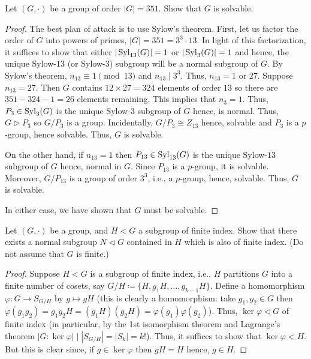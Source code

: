 \begin{problem}
Let $(G,\cdot)$ be a group of order $|G|=351$. Show that $G$ is solvable.
\end{problem}
\begin{proof}
The best plan of attack is to use Sylow's theorem. First, let us factor the
order of $G$ into powers of primes, $|G|=351=3^3\cdot 13$. In light of this
factorization, it suffices to show that either $|\operatorname{Syl}_{13}(G)|=1$ or
$|\operatorname{Syl}_3(G)|=1$ and hence, the unique Sylow-$13$ (or Sylow-$3$) subgroup
will be a normal subgroup of $G$. By Sylow's theorem, $n_{13}\equiv
1\pmod{13}$ and $n_{13}\mid 3^3$. Thus, $n_{13}=1$ or $27$. Suppose
$n_{13}=27$. Then $G$ contains $12\times 27=324$ elements of order $13$ so
there are $351-324-1=26$ elements remaining. This implies that
$n_3=1$. Thus, $P_3\in\operatorname{Syl}_3(G)$ is the unique Sylow-$3$ subgroup of $G$
hence, is normal. Thus, $G\rhd P_3$ so $G/P_3$ is a group. Incidentally,
$G/P_3\cong Z_{13}$ hence, solvable and $P_3$ is a $p$-group, hence
solvable. Thus, $G$ is solvable.

On the other hand, if $n_{13}=1$ then $P_{13}\in\operatorname{Syl}_{13}(G)$ is the unique
Sylow-$13$ subgroup of $G$ hence, normal in $G$. Since $P_{13}$ is a
$p$-group, it is solvable. Moreover, $G/P_{13}$ is a group of order $3^3$,
i.e., a $p$-group, hence, solvable. Thus, $G$ is solvable.

In either case, we have shown that $G$ must be solvable.
\end{proof}

\begin{problem}
Let $(G,\cdot)$ be a group, and $H<G$ a subgroup of finite index. Show that
there exists a normal subgroup $N\lhd G$ contained in $H$ which is also of
finite index. (Do not assume that $G$ is finite.)
\end{problem}
\begin{proof}
Suppose $H<G$ is a subgroup of finite index, i.e., $H$ partitions $G$ into
a finite number of cosets, say $G/H\coloneqq
\{H,g_1H,...,g_{k-1}H\}$. Define a homomorphism$\varphi\colon G\to
S_{G/H}$ by $g\mapsto gH$ (this is clearly a homomorphism: take $g_1,g_2\in
G$ then
$\varphi(g_1g_2)=g_1g_2H=(g_1H)(g_2H)=\varphi(g_1)\varphi(g_2)$). Thus,
$\ker\varphi\lhd G$ of finite index (in particular, by the 1st isomorphism
theorem and Lagrange's theorem $|G:\ker\varphi|\mid
|S_{G/H}|=|S_k|=k!$). Thus, it suffices to show that $\ker\varphi<H$. But
this is clear since, if $g\in\ker\varphi$ then $gH=H$ hence, $g\in H$.
\end{proof}

